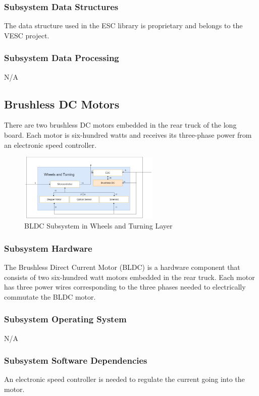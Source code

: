 \subsubsection{Subsystem Data Structures}
The data structure used in the ESC library is proprietary and belongs to the VESC project. 

\subsubsection{Subsystem Data Processing}
N/A

\subsection{Brushless DC Motors}
There are two brushless DC motors embedded in the rear truck of the long board. Each motor is six-hundred watts and receives its three-phase power from an electronic speed controller.

\begin{figure}[h!]
	\centering
 	\includegraphics[width=0.60\textwidth]{images/Keaton/BLDC.png}
 \caption{BLDC Subsystem in Wheels and Turning Layer}
\end{figure}

\subsubsection{Subsystem Hardware}
The Brushless Direct Current Motor (BLDC) is a hardware component that consists of two six-hundred watt motors embedded in the rear truck. Each motor has three power wires corresponding to the three phases needed to electrically commutate the BLDC motor.

\subsubsection{Subsystem Operating System}
N/A

\subsubsection{Subsystem Software Dependencies}
An electronic speed controller is needed to regulate the current going into the motor.

